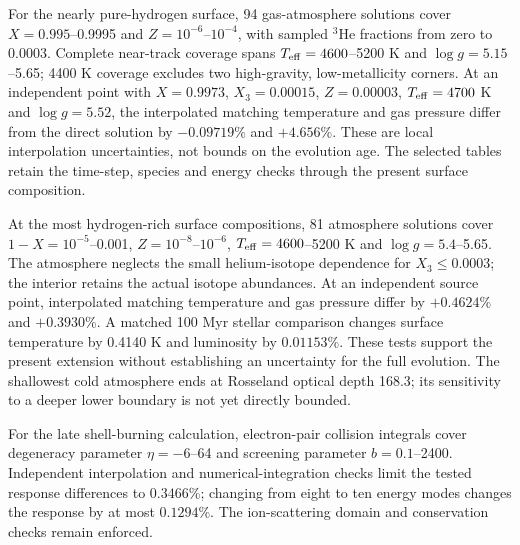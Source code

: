 \documentclass[11pt,letterpaper]{article}
\begin{document}
For the nearly pure-hydrogen surface, 94 gas-atmosphere solutions cover
$X=0.995$--0.9995 and $Z=10^{-6}$--$10^{-4}$, with sampled
$^3$He fractions from zero to 0.0003. Complete near-track coverage spans
$T_{\rm eff}=4600$--5200 K and $\log g=5.15$--5.65;
4400 K coverage excludes two high-gravity, low-metallicity corners.
At an independent point with $X=0.9973$, $X_3=0.00015$, $Z=0.00003$,
$T_{\rm eff}=4700$ K and $\log g=5.52$, the interpolated matching
temperature and gas pressure differ from the direct solution by
$-0.09719\%$ and $+4.656\%$. These are local interpolation uncertainties,
not bounds on the evolution age. The selected tables retain the time-step,
species and energy checks through the present surface composition.

At the most hydrogen-rich surface compositions, 81 atmosphere solutions
cover $1-X=10^{-5}$--0.001, $Z=10^{-8}$--$10^{-6}$,
$T_{\rm eff}=4600$--5200 K and $\log g=5.4$--5.65.
The atmosphere neglects the small helium-isotope dependence for
$X_3\leq0.0003$; the interior retains the actual isotope abundances.
At an independent source point, interpolated matching temperature and
gas pressure differ by $+0.4624\%$ and $+0.3930\%$.
A matched 100 Myr stellar comparison changes surface temperature by
0.4140 K and luminosity by $0.01153\%$. These tests support the present
extension without establishing an uncertainty for the full evolution.
The shallowest cold atmosphere ends at Rosseland optical depth 168.3;
its sensitivity to a deeper lower boundary is not yet directly bounded.

For the late shell-burning calculation, electron-pair collision integrals
cover degeneracy parameter $\eta=-6$--64 and screening parameter
$b=0.1$--2400. Independent interpolation and numerical-integration checks
limit the tested response differences to $0.3466\%$; changing from eight
to ten energy modes changes the response by at most $0.1294\%$.
The ion-scattering domain and conservation checks remain enforced.
\end{document}
